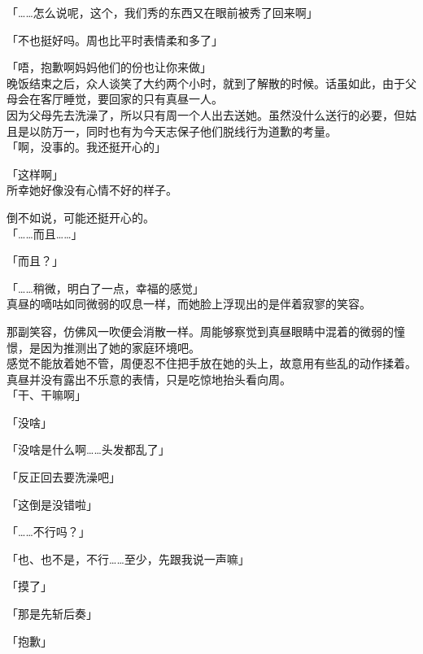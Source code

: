 「……怎么说呢，这个，我们秀的东西又在眼前被秀了回来啊」

「不也挺好吗。周也比平时表情柔和多了」\\

\vspace{2\baselineskip}

「唔，抱歉啊妈妈他们的份也让你来做」\\

晚饭结束之后，众人谈笑了大约两个小时，就到了解散的时候。话虽如此，由于父母会在客厅睡觉，要回家的只有真昼一人。\\

因为父母先去洗澡了，所以只有周一个人出去送她。虽然没什么送行的必要，但姑且是以防万一，同时也有为今天志保子他们脱线行为道歉的考量。\\

「啊，没事的。我还挺开心的」

「这样啊」\\

所幸她好像没有心情不好的样子。

倒不如说，可能还挺开心的。\\

「……而且……」

「而且？」

「……稍微，明白了一点，幸福的感觉」\\

真昼的嘀咕如同微弱的叹息一样，而她脸上浮现出的是伴着寂寥的笑容。

那副笑容，仿佛风一吹便会消散一样。周能够察觉到真昼眼睛中混着的微弱的憧憬，是因为推测出了她的家庭环境吧。\\

感觉不能放着她不管，周便忍不住把手放在她的头上，故意用有些乱的动作揉着。\\

真昼并没有露出不乐意的表情，只是吃惊地抬头看向周。\\

「干、干嘛啊」

「没啥」

「没啥是什么啊……头发都乱了」

「反正回去要洗澡吧」

「这倒是没错啦」

「……不行吗？」

「也、也不是，不行……至少，先跟我说一声嘛」

「摸了」

「那是先斩后奏」

「抱歉」\\

